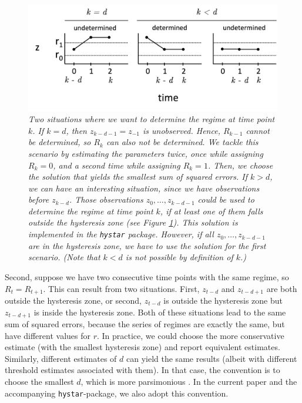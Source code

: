 \documentclass{article}
\begin{document}
\begin{figure}
\begin{center}
\includegraphics[scale=.6]{unknown_start.png}
\caption{\textit{Two situations where we want to determine the regime at time point $k$. 
If $k = d$, then $z_{k-d-1} = z_{-1}$ is unobserved. Hence, $R_{k-1}$ cannot be determined, so $R_{k}$ can also not be determined. We tackle this scenario by estimating the parameters twice, once while assigning $R_k = 0$, and a second time while assigning $R_k = 1$. Then, we choose the solution that yields the smallest sum of squared errors.
If $k > d$, we can have an interesting situation, since we have observations before $z_{k-d}$. 
Those observations $z_{0}, \dots, z_{k - d - 1}$ could be used to determine the regime at time point $k$, if at least one of them falls outside the hysteresis zone (see Figure \ref{fig:unknown_start}). This solution is implemented in the \texttt{hystar} package. 
However, if all $z_{0}, \dots, z_{k - d - 1}$ are in the hysteresis zone, we have to use the solution for the first scenario. (Note that $k < d$ is not possible by definition of $k$.)}}
\label{fig:unknown_start}
\end{center}
\end{figure}

Second, suppose we have two consecutive time points with the same regime, so $R_t = R_{t+1}$. This can result from two situations. First, $z_{t - d}$ and $z_{t - d + 1}$ are both outside the hysteresis zone, or second, $z_{t - d}$ is outside the hysteresis zone but $z_{t - d + 1}$ is inside the hysteresis zone. Both of these situations lead to the same sum of squared errors, because the series of regimes are exactly the same, but have different values for $r$.
In practice, we could choose the more conservative estimate (with the smallest hysteresis zone) and report equivalent estimates. Similarly, different estimates of $d$ can yield the same results (albeit with different threshold estimates associated with them). 
In that case, the convention is to choose the smallest $d$, which is more parsimonious \citep{bar2}. In the current paper and the accompanying \texttt{hystar}-package, we also adopt this convention.
\end{document}
